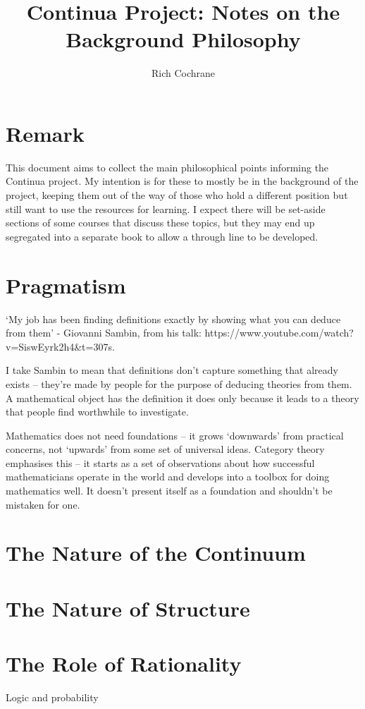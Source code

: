 \documentclass[article]{article}
\begin{document}
	\title{Continua Project: Notes on the Background Philosophy}
	\author{Rich Cochrane}
	\maketitle
	
\section*{Remark}

This document aims to collect the main philosophical points informing the Continua project. My intention is for these to mostly be in the background of the project, keeping them out of the way of those who hold a different position but still want to use the resources for learning. I expect there will be set-aside sections of some courses that discuss these topics, but they may end up segregated into a separate book to allow a through line to be developed.

\section{Pragmatism}

`My job has been finding definitions exactly by showing what you can deduce from them' - Giovanni Sambin, from his talk: https://www.youtube.com/watch?v=SiswEyrk2h4&t=307s. 

I take Sambin to mean that definitions don't capture something that already exists -- they're made by people for the purpose of deducing theories from them. A mathematical object has the definition it does only because it leads to a theory that people find worthwhile to investigate.

Mathematics does not need foundations -- it grows `downwards' from practical concerns, not `upwards' from some set of universal ideas. Category theory emphasises this -- it starts as a set of observations about how successful mathematicians operate in the world and develops into a toolbox for doing mathematics well. It doesn't present itself as a foundation and shouldn't be mistaken for one. 

\section{The Nature of the Continuum}

\section{The Nature of Structure}

\section{The Role of Rationality}

Logic and probability
\end{document}

